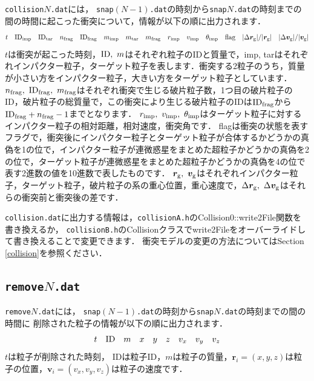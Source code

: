 \documentclass[12pt,a4paper,dvipdfmx]{jsarticle}
\begin{document}
\texttt{collision}$N$\texttt{.dat}には，
\texttt{snap}$(N-1)$\texttt{.dat}の時刻から\texttt{snap}$N$\texttt{.dat}の時刻までの間の時間に起こった衝突について，情報が以下の順に出力されます．
\[
t\quad {\rm ID}_{\rm imp}\quad {\rm ID}_{\rm tar}\quad n_{\rm frag}\quad {\rm ID}_{\rm frag}\quad m_{\rm imp}\quad m_{\rm tar}\quad m_{\rm frag} \quad r_{\rm imp} \quad v_{\rm imp} \quad \theta_{\rm imp} \quad {\rm flag}\quad |\Delta \bm{r}_{\rm g}|/|\bm{r}_{\rm g}| \quad |\Delta \bm{v}_{\rm g}|/|\bm{v}_{\rm g}|
\]
$t$は衝突が起こった時刻，${\rm ID},\ m$はそれぞれ粒子のIDと質量で，imp, tarはそれぞれインパクター粒子，ターゲット粒子を表します．衝突する2粒子のうち，質量が小さい方をインパクター粒子，大きい方をターゲット粒子としています．
$n_{\rm frag},\ {\rm ID}_{\rm frag},\ m_{\rm frag}$はそれぞれ衝突で生じる破片粒子数，1つ目の破片粒子のID，破片粒子の総質量で，この衝突により生じる破片粒子のIDは${\rm ID}_{\rm frag}$から${\rm ID}_{\rm frag}+n_{\rm frag}-1$までとなります．
$r_{\rm imp},\ v_{\rm imp},\ \theta_{\rm imp}$はターゲット粒子に対するインパクター粒子の相対距離，相対速度，衝突角です．
flagは衝突の状態を表すフラグで，衝突後にインパクター粒子とターゲット粒子が合体するかどうかの真偽を1の位で，インパクター粒子が連微惑星をまとめた超粒子かどうかの真偽を2の位で，ターゲット粒子が連微惑星をまとめた超粒子かどうかの真偽を4の位で表す2進数の値を10進数で表したものです．
$ \bm{r}_{\rm g},\ \bm{v}_{\rm g}$はそれぞれインパクター粒子，ターゲット粒子，破片粒子の系の重心位置，重心速度で，$\Delta \bm{r}_{\rm g},\ \Delta \bm{v}_{\rm g}$はそれらの衝突前と衝突後の差です．

\texttt{collision.dat}に出力する情報は，\texttt{collisionA.h}のCollision0::write2File関数を書き換えるか，
\texttt{collisionB.h}のCollisionクラスでwrite2Fileをオーバーライドして書き換えることで変更できます．
衝突モデルの変更の方法についてはSection \ref{collision}を参照ください．



\subsection{\texttt{remove}$N$\texttt{.dat}}

\texttt{remove}$N$\texttt{.dat}には，
\texttt{snap}$(N-1)$\texttt{.dat}の時刻から\texttt{snap}$N$\texttt{.dat}の時刻までの間の時間に
削除された粒子の情報が以下の順に出力されます．
\[
t\quad {\rm ID}\quad m \quad x\quad y\quad z\quad v_{x}\quad v_{y} \quad v_{z}
\]
$t$は粒子が削除された時刻，
IDは粒子ID，$m$は粒子の質量，$\bm{r}_{i}=(x,y,z)$は粒子の位置，$\bm{v}_{i}=(v_{x},v_{y},v_{z})$は粒子の速度です．
\end{document}
